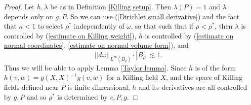 \documentclass[reqno,12pt,letterpaper]{amsart}
\theoremstyle{definition}
\numberwithin{equation}{section}
\begin{document}
\begin{proof}
Let $h,\lambda$ be as in Definition \ref{Killing setup}.
Then $\lambda(P) = 1$ and $\lambda$ depends only on $g,P$.
So we can use (\ref{Dirichlet small derivative}) and the fact that $\kappa < 1$ to select $\rho^*$ independently of $\omega$, so that such that
if $\rho < \rho^*$, then $\lambda$ is controlled by (\ref{estimate on Killing weight}),
$h$ is controlled by (\ref{estimate on normal coordinates}, \ref{estimate on normal volume form}), and
$$||d\omega||_{L^\infty(B_\rho)} \cdot |B_\rho| \lesssim 1.$$
Thus we will be able to apply Lemma \ref{Taylor lemma}.
Since $h$ is of the form $h(v, w) = g(X, X)^{-1} g(v, w)$ for a Killing field $X$, and the space of Killing fields defined near $P$ is finite-dimensional, $h$ and its derivatives are all controlled by $g,P$ and so $\rho^*$ is determined by $c,P,g$.


\end{proof}
\end{document}
